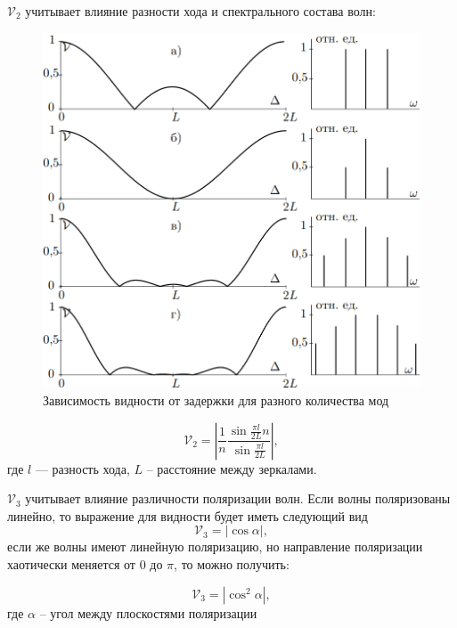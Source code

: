 \documentclass[12pt]{article}
\begin{document}
    $\mathcal{V}_2$ учитывает влияние разности хода и спектрального состава волн:

    \begin{figure}
        \label{fig:fig1}
        \centering
        \includegraphics[width=\linewidth]{pic/v2}
        \caption{Зависимость видности от задержки для разного количества мод}
    \end{figure}

    \begin{equation}
        \label{eq:eq4}
        \mathcal{V}_2=\left|\frac{1}{n}\frac{\sin\frac{\pi l}{2L}n}{\sin\frac{\pi l}{2L}}\right|,
    \end{equation}
    где $l$ --- разность хода, $L$ -- расстояние между зеркалами.

    $\mathcal{V}_3$ учитывает влияние различности поляризации волн.
    Если волны поляризованы линейно, то выражение для видности будет иметь следующий вид
    \begin{equation}
        \label{eq:eq5}
        \mathcal{V}_3 = |\cos \alpha|,
    \end{equation}
    если же волны имеют линейную поляризацию,
    но направление поляризации хаотически меняется от 0 до $\pi$, то можно получить:

    \begin{equation}
        \label{}
        \mathcal{V}_3 = \left|\cos^2{\alpha}\right|,
    \end{equation}
    где $\alpha$ -- угол между плоскостями поляризации
\end{document}
